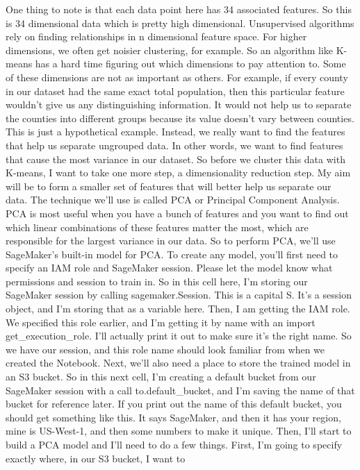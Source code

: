 One thing to note is that each data point here has 34 associated
features. So this is 34 dimensional data which is pretty high
dimensional. Unsupervised algorithms rely on finding relationships in n
dimensional feature space. For higher dimensions, we often get noisier
clustering, for example. So an algorithm like K-means has a hard time
figuring out which dimensions to pay attention to. Some of these
dimensions are not as important as others. For example, if every county
in our dataset had the same exact total population, then this particular
feature wouldn't give us any distinguishing information. It would not
help us to separate the counties into different groups because its value
doesn't vary between counties. This is just a hypothetical example.
Instead, we really want to find the features that help us separate
ungrouped data. In other words, we want to find features that cause the
most variance in our dataset. So before we cluster this data with
K-means, I want to take one more step, a dimensionality reduction step.
My aim will be to form a smaller set of features that will better help
us separate our data. The technique we'll use is called PCA or Principal
Component Analysis. PCA is most useful when you have a bunch of features
and you want to find out which linear combinations of these features
matter the most, which are responsible for the largest variance in our
data. So to perform PCA, we'll use SageMaker's built-in model for PCA.
To create any model, you'll first need to specify an IAM role and
SageMaker session. Please let the model know what permissions and
session to train in. So in this cell here, I'm storing our SageMaker
session by calling sagemaker.Session. This is a capital S. It's a
session object, and I'm storing that as a variable here. Then, I am
getting the IAM role. We specified this role earlier, and I'm getting it
by name with an import get\_execution\_role. I'll actually print it out
to make sure it's the right name. So we have our session, and this role
name should look familiar from when we created the Notebook. Next, we'll
also need a place to store the trained model in an S3 bucket. So in this
next cell, I'm creating a default bucket from our SageMaker session with
a call to.default\_bucket, and I'm saving the name of that bucket for
reference later. If you print out the name of this default bucket, you
should get something like this. It says SageMaker, and then it has your
region, mine is US-West-1, and then some numbers to make it unique.
Then, I'll start to build a PCA model and I'll need to do a few things.
First, I'm going to specify exactly where, in our S3 bucket, I want to
